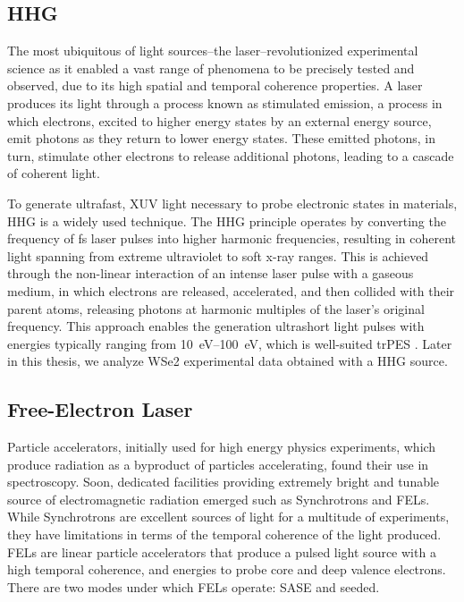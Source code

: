 \subsection*{HHG}
The most ubiquitous of light sources--the laser--revolutionized experimental science as it enabled a vast range of phenomena to be precisely tested and observed, due to its high spatial and temporal coherence properties. A laser produces its light through a process known as stimulated emission, a process in which electrons, excited to higher energy states by an external energy source, emit photons as they return to lower energy states. These emitted photons, in turn, stimulate other electrons to release additional photons, leading to a cascade of coherent light.

To generate ultrafast, \gls{XUV} light necessary to probe electronic states in materials, \gls{HHG} is a widely used technique. The \Gls{HHG} principle operates by converting the frequency of \unit{fs} laser pulses into higher harmonic frequencies, resulting in coherent light spanning from extreme ultraviolet to soft x-ray ranges. This is achieved through the non-linear interaction of an intense laser pulse with a gaseous medium, in which electrons are released, accelerated, and then collided with their parent atoms, releasing photons at harmonic multiples of the laser’s original frequency. This approach enables the generation ultrashort light pulses with energies typically ranging from \qtyrange{10}{100}{eV}, which is well-suited \gls{trPES} \cite{macklinHighorderHarmonicGeneration1993}. Later in this thesis, we analyze \gls{WSe2} experimental data obtained with a \gls{HHG} source.

\subsection*{Free-Electron Laser}
Particle accelerators, initially used for high energy physics experiments, which produce radiation as a byproduct of particles accelerating, found their use in spectroscopy. Soon, dedicated facilities providing extremely bright and tunable source of electromagnetic radiation emerged such as Synchrotrons and \glspl{FEL}.
While Synchrotrons are excellent sources of light for a multitude of experiments, they have limitations in terms of the temporal coherence of the light produced. \Glspl{FEL} are linear particle accelerators that produce a pulsed light source with a high temporal coherence, and energies to probe core and deep valence electrons. There are two modes under which \glspl{FEL} operate: \gls{SASE} and seeded.

